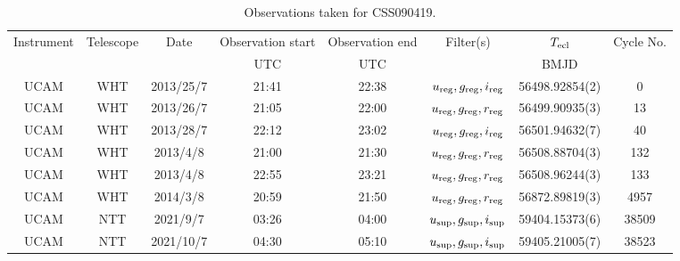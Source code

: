 \begin{table}
	\begin{center}
		\caption{Observations taken for CSS090419.}
		\label{table:observing:observation logs CSS090419}
		\begin{tabular}{cccccccc}
			\hline
			Instrument & Telescope & Date & Observation start & Observation end & Filter(s) & $T_{\rm ecl}$ & Cycle No. \\
			 &  &  & UTC & UTC &  & BMJD &  \\
			\hline
			\hline
			UCAM & WHT & 2013/25/7 & 21:41 & 22:38 & $u_{\rm reg},g_{\rm reg},i_{\rm reg}$ & 56498.92854(2) &    0 \\
			UCAM & WHT & 2013/26/7 & 21:05 & 22:00 & $u_{\rm reg},g_{\rm reg},r_{\rm reg}$ & 56499.90935(3) &   13 \\
			UCAM & WHT & 2013/28/7 & 22:12 & 23:02 & $u_{\rm reg},g_{\rm reg},i_{\rm reg}$ & 56501.94632(7) &   40 \\
			UCAM & WHT & 2013/4/8  & 21:00 & 21:30 & $u_{\rm reg},g_{\rm reg},r_{\rm reg}$ & 56508.88704(3) &  132 \\
			UCAM & WHT & 2013/4/8  & 22:55 & 23:21 & $u_{\rm reg},g_{\rm reg},r_{\rm reg}$ & 56508.96244(3) &  133 \\
			UCAM & WHT & 2014/3/8  & 20:59 & 21:50 & $u_{\rm reg},g_{\rm reg},r_{\rm reg}$ & 56872.89819(3) & 4957 \\
			UCAM & NTT & 2021/9/7  & 03:26 & 04:00  & $u_{\rm sup},g_{\rm sup},i_{\rm sup}$ & 59404.15373(6) & 38509 \\
			UCAM & NTT & 2021/10/7 & 04:30 & 05:10  & $u_{\rm sup},g_{\rm sup},i_{\rm sup}$ & 59405.21005(7) & 38523 \\
		   \hline
		\end{tabular}
	\end{center}
\end{table}